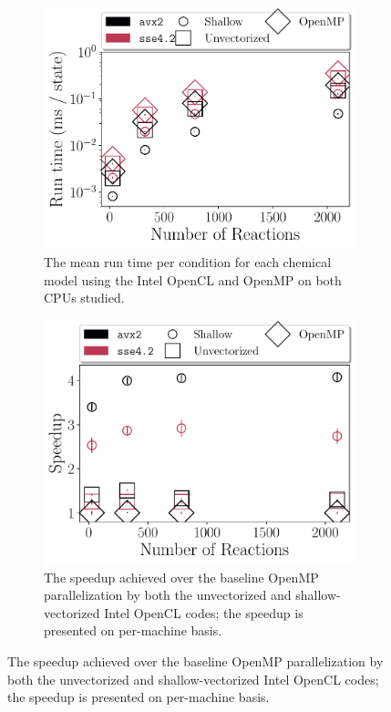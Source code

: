 \documentclass[12pt,number,sort&compress,preprint]{elsarticle}
\begin{document}
\begin{figure}[htbp]
   \centering
  \begin{subfigure}[t]{0.48\linewidth}
      \includegraphics[width=\textwidth]{intel_source_nonorm.pdf}
      \caption{The mean run time per condition for each chemical model using the Intel OpenCL and OpenMP on both CPUs studied.}
      \label{F:intel_source_nonorm}
  \end{subfigure}
  \hfill
  \begin{subfigure}[t]{0.48\linewidth}
      \includegraphics[width=\textwidth]{intel_source.pdf}
      \caption{The speedup achieved over the baseline OpenMP parallelization by both the unvectorized and shallow-vectorized Intel OpenCL codes; the speedup is presented on per-machine basis.}

\end{subfigure}
\end{figure}
\end{document}
